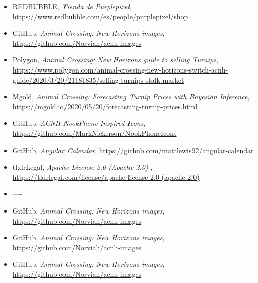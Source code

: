 \begin{itemize}
	\item REDBUBBLE, \textit{Tienda de Purplepixel}, \url{https://www.redbubble.com/es/people/purplepixel/shop}
	
	\item GitHub, \textit{Animal Crossing: New Horizons images}, \url{https://github.com/Norviah/acnh-images}
	
	\item Polygon, \textit{Animal Crossing: New Horizons guide to selling Turnips}, \url{https://www.polygon.com/animal-crossing-new-horizons-switch-acnh-guide/2020/3/20/21181835/selling-turnips-stalk-market}
	
	\item Mgold, \textit{Animal Crossing: Forecasting Turnip Prices with Bayesian Inference}, \url{https://mgold.io/2020/05/20/forecasting-turnip-prices.html}
	
	\item GitHub, \textit{ACNH NookPhone Inspired Icons}, \url{https://github.com/MarkNickerson/NookPhoneIcons}
	
	\item GitHub, \textit{Angular Calendar}, \url{https://github.com/mattlewis92/angular-calendar}
	
	\item tl;drLegal, \textit{Apache License 2.0 (Apache-2.0) }, \url{https://tldrlegal.com/license/apache-license-2.0-(apache-2.0)}
	
		\item ----
		
	\item GitHub, \textit{Animal Crossing: New Horizons images}, \url{https://github.com/Norviah/acnh-images}
	
	\item GitHub, \textit{Animal Crossing: New Horizons images}, \url{https://github.com/Norviah/acnh-images}
	
	\item GitHub, \textit{Animal Crossing: New Horizons images}, \url{https://github.com/Norviah/acnh-images}
	
\end{itemize}